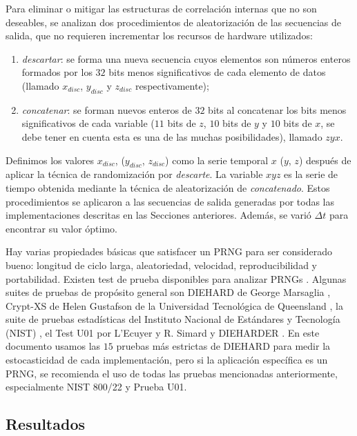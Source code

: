 Para eliminar o mitigar las estructuras de correlación internas que no son deseables, se analizan dos procedimientos de aleatorización de las secuencias de salida, que no requieren incrementar los recursos de hardware utilizados:
\begin{enumerate}
\item \textit{descartar}: se forma una nueva secuencia cuyos elementos son números enteros formados por los $32$ bits menos significativos de cada elemento de datos (llamado $x_{disc}$, $y_{disc}$ y $z_{disc}$ respectivamente);
\item \textit{concatenar}: se forman nuevos enteros de $32$ bits al concatenar los bits menos significativos de cada variable ($11$ bits de $z$, $10$ bits de $y$ y $10$ bits de $x$, se debe tener en cuenta esta es una de las muchas posibilidades), llamado $zyx$.
\end{enumerate}
Definimos los valores $x_ {disc}$, ($ y_{disc}$, $z_{disc}$) como la serie temporal $x$ ($ y $, $ z $) después de aplicar la técnica de randomización por \textit{descarte}.
La variable $xyz$ es la serie de tiempo obtenida mediante la técnica de aleatorización de \textit{concatenado}.
Estos procedimientos se aplicaron a las secuencias de salida generadas por todas las implementaciones descritas en las Secciones anteriores.
Además, se varió $\Delta t$ para encontrar su valor óptimo.

Hay varias propiedades básicas que satisfacer un PRNG para ser considerado bueno: longitud de ciclo larga, aleatoriedad, velocidad, reproducibilidad y portabilidad.
Existen test de prueba disponibles para analizar PRNGs \cite{Soto}.
Algunas suites de pruebas de propósito general son DIEHARD de George Marsaglia \cite{Marsaglia1995}, Crypt-XS de Helen Gustafson de la Universidad Tecnológica de Queensland \cite{Gustafson1994}, la suite de pruebas estadísticas del Instituto Nacional de Estándares y Tecnología (NIST) \cite{Rukhin2000}, el Test U01 por L'Ecuyer y R. Simard \cite{Lecuyer2007} y DIEHARDER \cite{Brown2012}.
En este documento usamos las $15$ pruebas más estrictas de DIEHARD \cite{Marsaglia1995} para medir la estocasticidad de cada implementación, pero si la aplicación específica es un PRNG, se recomienda el uso de todas las pruebas mencionadas anteriormente, especialmente NIST 800/22 y Prueba U01.

\subsection{Resultados}

